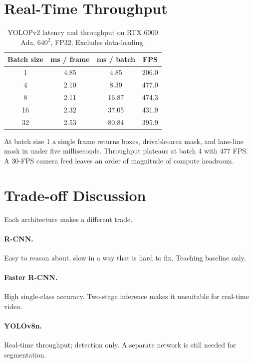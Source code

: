 \documentclass[12pt,a4paper]{report}
\begin{document}
\section{Real-Time Throughput}

\begin{table}[H]
\centering
\caption{YOLOPv2 latency and throughput on RTX 6000 Ada, $640^2$, FP32. Excludes data-loading.}
\label{tab:fps}
\small
\begin{tabular}{@{}cccc@{}}
\toprule
\textbf{Batch size} & \textbf{ms / frame} & \textbf{ms / batch} & \textbf{FPS} \\
\midrule
1   & 4.85 & 4.85  & 206.0 \\
4   & 2.10 & 8.39  & 477.0 \\
8   & 2.11 & 16.87 & 474.3 \\
16  & 2.32 & 37.05 & 431.9 \\
32  & 2.53 & 80.84 & 395.9 \\
\bottomrule
\end{tabular}
\end{table}

At batch size 1 a single frame returns boxes, drivable-area mask, and lane-line mask in under five milliseconds. Throughput plateaus at batch 4 with $477$ FPS. A $30$-FPS camera feed leaves an order of magnitude of compute headroom.

\section{Trade-off Discussion}

Each architecture makes a different trade.

\paragraph{R-CNN.} Easy to reason about, slow in a way that is hard to fix. Teaching baseline only.

\paragraph{Faster R-CNN.} High single-class accuracy. Two-stage inference makes it unsuitable for real-time video.

\paragraph{YOLOv8n.} Real-time throughput; detection only. A separate network is still needed for segmentation.
\end{document}
